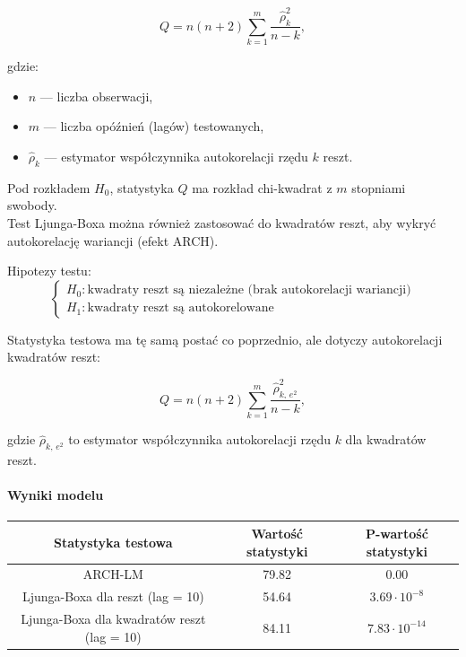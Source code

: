 \documentclass{article}
\begin{document}
{\[
Q = n(n+2) \sum_{k=1}^m \frac{\hat{\rho}_k^2}{n-k},
\]

gdzie:

\begin{itemize}
    \item \( n \) — liczba obserwacji,
    \item \( m \) — liczba opóźnień (lagów) testowanych,
    \item \( \hat{\rho}_k \) — estymator współczynnika autokorelacji rzędu \( k \) reszt.
\end{itemize}

Pod rozkładem \(H_0\), statystyka \(Q\) ma rozkład chi-kwadrat z \(m\) stopniami swobody. \\

 Test Ljunga-Boxa można również zastosować do kwadratów reszt, aby wykryć autokorelację wariancji (efekt ARCH).

Hipotezy testu:
\[
\begin{cases}
H_0: \text{kwadraty reszt są niezależne (brak autokorelacji wariancji)} \\
H_1: \text{kwadraty reszt są autokorelowane}
\end{cases}
\]

Statystyka testowa ma tę samą postać co poprzednio, ale dotyczy autokorelacji kwadratów reszt:

\[
Q = n(n+2) \sum_{k=1}^m \frac{\hat{\rho}_{k,\,e^2}^2}{n-k},
\]

gdzie \( \hat{\rho}_{k,\,e^2} \) to estymator współczynnika autokorelacji rzędu \( k \) dla kwadratów reszt. 

\paragraph{Wyniki modelu} 

\begin{center}
\begin{tabular}{|c|c|c|}
\hline
\textbf{Statystyka testowa} & \textbf{Wartość statystyki} & \textbf{P-wartość statystyki} \\
\hline
ARCH-LM & 79.82 & 0.00 \\
Ljunga-Boxa dla reszt (lag = 10) &  54.64 & $3.69 \cdot 10^{-8}$ \\
Ljunga-Boxa dla kwadratów reszt (lag = 10) & 84.11 & $7.83 \cdot 10^{-14}$ \\
\hline
\end{tabular}
\end{center}

}
\end{document}
